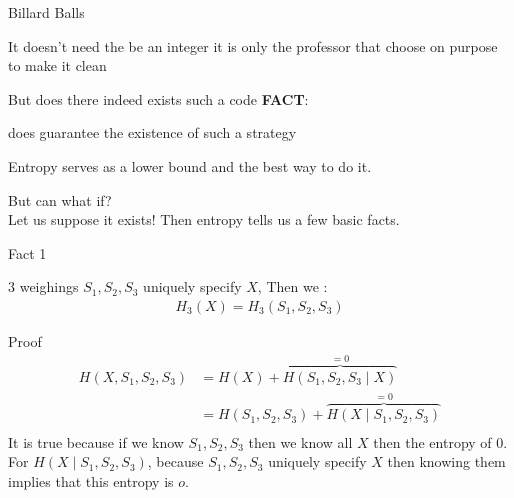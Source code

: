 \begin{parag}{Billard Balls}
\begin{framedremark}
    It doesn't need the be an integer it is only the professor that choose on purpose to make it clean
\end{framedremark}
\begin{subparag}{But does there indeed exists such a code}
    \textbf{FACT}:
    \begin{center}
         does  guarantee the existence of such a strategy
    \end{center}
   Entropy serves as a lower bound and  the best way to do it.  
\end{subparag}
    But can what if? \\
    Let us suppose it exists! Then entropy tells us a few basic facts.
\end{parag}
\begin{parag}{Fact 1}

          $3$ weighings $S_1, S_2, S_3$ uniquely specify $X$, Then we :
            \begin{align*}
                H_3(X) = H_3(S_1, S_2, S_3)
            \end{align*} 
    
            \begin{subparag}{Proof}
                \begin{align*}
                    H(X, S_1, S_2, S_3) &= H(X) + \overbrace{H(S_1, S_2, S_3 \mid  X)}^{=0} \\
                                        &= H(S_1, S_2, S_3) + \overbrace{H(X \mid  S_1, S_2, S_3)}^{=0} \\
                \end{align*}
               It is true because if we know $S_1, S_2, S_3$ then we know all $X$ then the entropy of $0$. \\
               For $H(X \mid  S_1, S_2, S_3)$, because $S_1, S_2, S_3$ uniquely specify $X$ then knowing them implies that this entropy is $o$.
                
            \end{subparag}
  
\end{parag}


